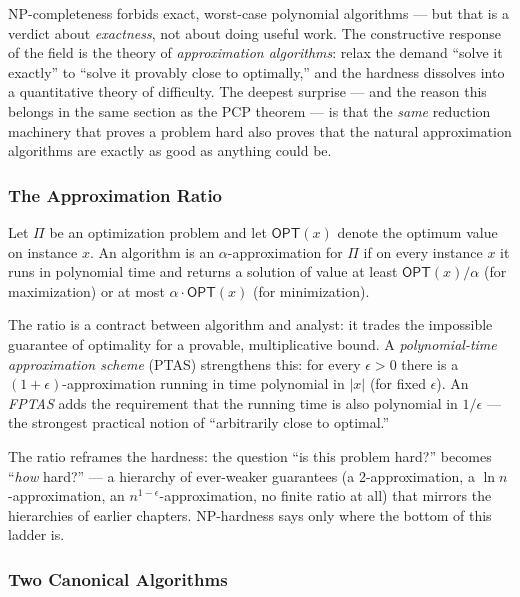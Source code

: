 NP-completeness forbids exact, worst-case polynomial algorithms --- but that is a verdict about \emph{exactness}, not about doing useful work. The constructive response of the field is the theory of \emph{approximation algorithms}: relax the demand ``solve it exactly'' to ``solve it provably close to optimally,'' and the hardness dissolves into a quantitative theory of difficulty. The deepest surprise --- and the reason this belongs in the same section as the PCP theorem --- is that the \emph{same} reduction machinery that proves a problem hard also proves that the natural approximation algorithms are exactly as good as anything could be.

\subsubsection*{The Approximation Ratio}

\begin{definition}
Let $\Pi$ be an optimization problem and let $\mathsf{OPT}(x)$ denote the optimum value on instance $x$. An algorithm is an $\alpha$-approximation for $\Pi$ if on every instance $x$ it runs in polynomial time and returns a solution of value at least $\mathsf{OPT}(x)/\alpha$ (for maximization) or at most $\alpha \cdot \mathsf{OPT}(x)$ (for minimization).
\end{definition}

The ratio is a contract between algorithm and analyst: it trades the impossible guarantee of optimality for a provable, multiplicative bound. A \emph{polynomial-time approximation scheme} (PTAS) strengthens this: for every $\epsilon > 0$ there is a $(1+\epsilon)$-approximation running in time polynomial in $|x|$ (for fixed $\epsilon$). An \emph{FPTAS} adds the requirement that the running time is also polynomial in $1/\epsilon$ --- the strongest practical notion of ``arbitrarily close to optimal.''

The ratio reframes the hardness: the question ``is this problem hard?'' becomes ``\emph{how} hard?'' --- a hierarchy of ever-weaker guarantees (a 2-approximation, a $\ln n$-approximation, an $n^{1-\epsilon}$-approximation, no finite ratio at all) that mirrors the hierarchies of earlier chapters. NP-hardness says only where the bottom of this ladder is.

\subsubsection*{Two Canonical Algorithms}

